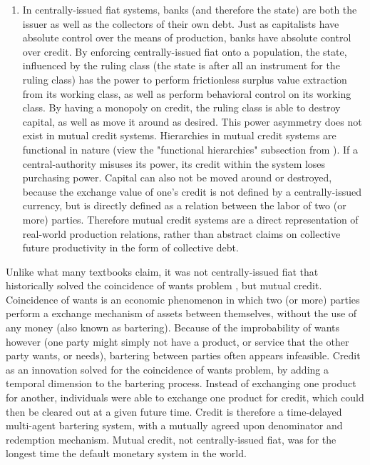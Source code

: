 \documentclass{article}
\begin{document}
\begin{enumerate}
    \item In centrally-issued fiat systems, banks (and therefore the state) are both the issuer as well as the collectors of their own debt. Just as capitalists have absolute control over the means of production, banks have absolute control over credit. By enforcing centrally-issued fiat onto a population, the state, influenced by the ruling class (the state is after all an instrument for the ruling class) has the power to perform frictionless surplus value extraction from its working class, as well as perform behavioral control on its working class. By having a monopoly on credit, the ruling class is able to destroy capital, as well as move it around as desired. This power asymmetry does not exist in mutual credit systems. Hierarchies in mutual credit systems are functional in nature (view the "functional hierarchies" subsection from \cite{swann_towards_2018}). If a central-authority misuses its power, its credit within the system loses purchasing power. Capital can also not be moved around or destroyed, because the exchange value of one's credit is not defined by a centrally-issued currency, but is directly defined as a relation between the labor of two (or more) parties. Therefore mutual credit systems are a direct representation of real-world production relations, rather than abstract claims on collective future productivity in the form of collective debt.
\end{enumerate}

Unlike what many textbooks claim, it was not centrally-issued fiat that historically solved the coincidence of wants problem \cite{szabo_shelling_2002}, but mutual credit. Coincidence of wants is an economic phenomenon in which two (or more) parties perform a exchange mechanism of assets between themselves, without the use of any money (also known as bartering). Because of the improbability of wants however (one party might simply not have a product, or service that the other party wants, or needs), bartering between parties often appears infeasible. Credit as an innovation solved for the coincidence of wants problem, by adding a temporal dimension to the bartering process. Instead of exchanging one product for another, individuals were able to exchange one product for credit, which could then be cleared out at a given future time. Credit is therefore a time-delayed multi-agent bartering system, with a mutually agreed upon denominator and redemption mechanism. Mutual credit, not centrally-issued fiat, was for the longest time the default monetary system in the world.
\end{document}
